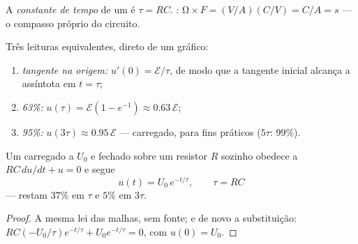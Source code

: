 \begin{definition}\label{def:g12:rc-rl-circuits:tau}
A \emph{constante de tempo} de um  é $\tau = RC$.
: $\unit{\ohm} \times \unit{F} = (\unit{V/A})(\unit{C/V}) = \unit{C/A} =
\unit{s}$ --- o compasso próprio do circuito.
\end{definition}

\begin{method}\label{met:g12:rc-rl-circuits:reading}
Três leituras equivalentes, direto de um gráfico:
\begin{enumerate}
  \item \emph{tangente na origem:} $u'(0) = \mathcal{E}/\tau$, de modo que a tangente
        inicial alcança a assíntota em $t = \tau$;
  \item \emph{63\%:} $u(\tau) = \mathcal{E}(1 - e^{-1}) \approx 0.63\,\mathcal{E}$;
  \item \emph{95\%:} $u(3\tau) \approx 0.95\,\mathcal{E}$ --- carregado, para fins
        práticos ($5\tau$: $99\%$).
\end{enumerate}
\end{method}

\begin{proposition}[Descarga]\label{prop:g12:rc-rl-circuits:discharge}
Um  carregado a $U_0$ e fechado sobre um resistor $R$ sozinho obedece a
$RC\,du/dt + u = 0$ e segue
\[
u(t) = U_0\,e^{-t/\tau}, \qquad \tau = RC
\]
--- restam $37\%$ em $\tau$ e $5\%$ em $3\tau$.
\end{proposition}

\begin{proof}
A mesma lei das malhas, sem fonte; e de novo a substituição:
$RC(-U_0/\tau)e^{-t/\tau} + U_0 e^{-t/\tau} = 0$, com $u(0) = U_0$.
\end{proof}

